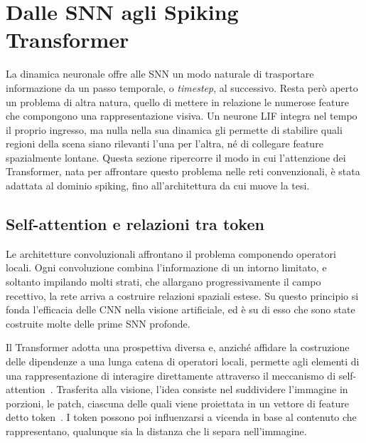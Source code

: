 \section{Dalle SNN agli Spiking Transformer}
\label{sec:snn_spiking_transformer}

La dinamica neuronale offre alle SNN un modo naturale di trasportare informazione da un passo temporale, o \emph{timestep}, al successivo. Resta però aperto un problema di altra natura, quello di mettere in relazione le numerose feature che compongono una rappresentazione visiva. Un neurone LIF integra nel tempo il proprio ingresso, ma nulla nella sua dinamica gli permette di stabilire quali regioni della scena siano rilevanti l'una per l'altra, né di collegare feature spazialmente lontane. Questa sezione ripercorre il modo in cui l'attenzione dei Transformer, nata per affrontare questo problema nelle reti convenzionali, è stata adattata al dominio spiking, fino all'architettura da cui muove la tesi.

\subsection{Self-attention e relazioni tra token}
\label{subsec:self_attention}

Le architetture convoluzionali affrontano il problema componendo operatori locali. Ogni convoluzione combina l'informazione di un intorno limitato, e soltanto impilando molti strati, che allargano progressivamente il campo recettivo, la rete arriva a costruire relazioni spaziali estese. Su questo principio si fonda l'efficacia delle CNN nella visione artificiale, ed è su di esso che sono state costruite molte delle prime SNN profonde.

Il Transformer adotta una prospettiva diversa e, anziché affidare la costruzione delle dipendenze a una lunga catena di operatori locali, permette agli elementi di una rappresentazione di interagire direttamente attraverso il meccanismo di self-attention~\cite{vaswani2017attention}. Trasferita alla visione, l'idea consiste nel suddividere l'immagine in porzioni, le patch, ciascuna delle quali viene proiettata in un vettore di feature detto token~\cite{dosovitskiy2021image}. I token possono poi influenzarsi a vicenda in base al contenuto che rappresentano, qualunque sia la distanza che li separa nell'immagine.

